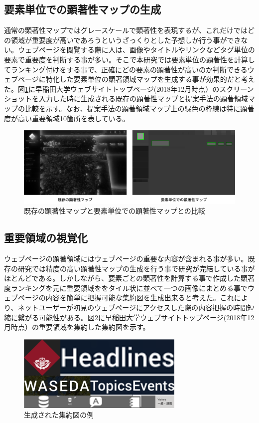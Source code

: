 \subsection{要素単位での顕著性マップの生成}
\par 通常の顕著性マップではグレースケールで顕著性を表現するが、これだけではどの領域が重要度が高いであろうというざっくりとした予想しか行う事ができない。ウェブページを閲覧する際に人は、画像やタイトルやリンクなどタグ単位の要素で重要度を判断する事が多い。そこで本研究では要素単位の顕著性を計算してランキング付けをする事で、正確にどの要素の顕著性が高いのか判断できるウェブページに特化した要素単位の顕著領域マップを生成する事が効果的だと考えた。図\ref{fig_comparesaliency}に早稲田大学ウェブサイトトップページ(2018年12月時点）\cite{waseda_top}のスクリーンショットを入力した時に生成される既存の顕著性マップと提案手法の顕著領域マップの比較を示す。なお、提案手法の顕著領域マップ上の緑色の枠線は特に顕著度が高い重要領域10箇所を表している。

\begin{figure}[H]
    \centering
    \includegraphics[width=12cm]{figures/example-originalsaliencymap.png}
    \caption{既存の顕著性マップと要素単位での顕著性マップとの比較}
    \label{fig_comparesaliency}
\end{figure}

\subsection{重要領域の視覚化}
\par ウェブページの顕著領域にはウェブページの重要な内容が含まれる事が多い。既存の研究では精度の高い顕著性マップの生成を行う事で研究が完結している事がほとんどである。しかしながら、要素ごとの顕著性を計算する事で作成した顕著度ランキングを元に重要領域ををタイル状に並べて一つの画像にまとめる事でウェブページの内容を簡単に把握可能な集約図を生成出来ると考えた。これにより、ネットユーザーが初見のウェブページにアクセスした際の内容把握の時間短縮に繋がる可能性がある。図\ref{fig_imoortanceregion}に早稲田大学ウェブサイトトップページ(2018年12月時点）\cite{waseda_top}の重要領域を集約した集約図を示す。

\begin{figure}[H]
    \centering
    \includegraphics[width=8cm]{figures/example-importanceregion.png}
    \caption{生成された集約図の例}
    \label{fig_imoortanceregion}
\end{figure}
